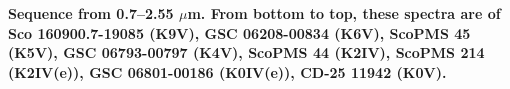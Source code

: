 {\bf Sequence from 0.7–2.55 $\mu$m. From bottom to top, these spectra are of Sco 160900.7-19085 (K9V), GSC 06208-00834 (K6V), ScoPMS 45 (K5V), GSC 06793-00797 (K4V), ScoPMS 44 (K2IV), ScoPMS 214 (K2IV(e)), GSC 06801-00186 (K0IV(e)), CD-25 11942 (K0V).\label{fig:stack-plot-k}}
